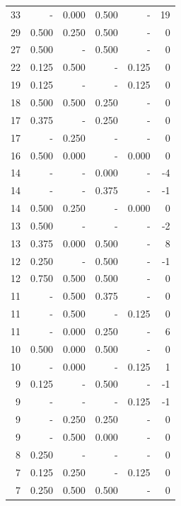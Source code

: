 \documentclass[a4paper]{article}\usepackage[]{graphicx}\usepackage[]{color}
\begin{document}
\begin{table}[ht]
\begin{tabular}{rrrrrr}
   \rowcolor{badColor} 33 & - & 0.000 & 0.500 & - & 19 \\ 
   \rowcolor{badColor} 29 & 0.500 & 0.250 & 0.500 & - & 0 \\ 
   \rowcolor{sosoColor} 27 & 0.500 & - & 0.500 & - & 0 \\ 
  22 & 0.125 & 0.500 & - & 0.125 & 0 \\ 
   \rowcolor{nullColor} 19 & 0.125 & - & - & 0.125 & 0 \\ 
   \rowcolor{badColor} 18 & 0.500 & 0.500 & 0.250 & - & 0 \\ 
   \rowcolor{sosoColor} 17 & 0.375 & - & 0.250 & - & 0 \\ 
  17 & - & 0.250 & - & - & 0 \\ 
  16 & 0.500 & 0.000 & - & 0.000 & 0 \\ 
   \rowcolor{sosoColor} 14 & - & - & 0.000 & - & -4 \\ 
   \rowcolor{sosoColor} 14 & - & - & 0.375 & - & -1 \\ 
  14 & 0.500 & 0.250 & - & 0.000 & 0 \\ 
   \rowcolor{nullColor} 13 & 0.500 & - & - & - & -2 \\ 
   \rowcolor{badColor} 13 & 0.375 & 0.000 & 0.500 & - & 8 \\ 
   \rowcolor{sosoColor} 12 & 0.250 & - & 0.500 & - & -1 \\ 
   \rowcolor{goodColor} 12 & 0.750 & 0.500 & 0.500 & - & 0 \\ 
  11 & - & 0.500 & 0.375 & - & 0 \\ 
  11 & - & 0.500 & - & 0.125 & 0 \\ 
   \rowcolor{badColor} 11 & - & 0.000 & 0.250 & - & 6 \\ 
   \rowcolor{badColor} 10 & 0.500 & 0.000 & 0.500 & - & 0 \\ 
  10 & - & 0.000 & - & 0.125 & 1 \\ 
   \rowcolor{sosoColor} 9 & 0.125 & - & 0.500 & - & -1 \\ 
   \rowcolor{nullColor} 9 & - & - & - & 0.125 & -1 \\ 
   \rowcolor{goodColor} 9 & - & 0.250 & 0.250 & - & 0 \\ 
   \rowcolor{badColor} 9 & - & 0.500 & 0.000 & - & 0 \\ 
   \rowcolor{nullColor} 8 & 0.250 & - & - & - & 0 \\ 
  7 & 0.125 & 0.250 & - & 0.125 & 0 \\ 
   \rowcolor{goodColor} 7 & 0.250 & 0.500 & 0.500 & - & 0 \\ 

\end{tabular}
\end{table}
\end{document}
